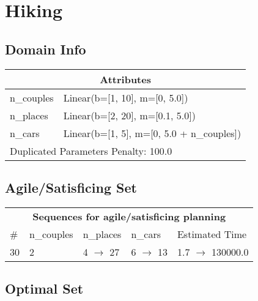 \documentclass{article}
\begin{document}
                            \newpage \section{Hiking}
                    \subsection*{Domain Info}

                    \begin{center}
                    \begin{tabular}{p{}p{}}
                    \multicolumn{2}{c}{\bf \large Attributes}\\\midrule
                    n\_couples & Linear(b=[1, 10], m=[0, 5.0])\\
n\_places & Linear(b=[2, 20], m=[0.1, 5.0])\\
n\_cars & Linear(b=[1, 5], m=[0, 5.0 + n\_couples])
                    
                     \\\midrule
                    \multicolumn{2}{l}{Duplicated Parameters Penalty: 100.0}
                    \end{tabular}
                    \end{center}
                
                         \subsection*{Agile/Satisficing Set}

                        \begin{center}
                        \begin{tabular}{l|l|l|l|l}
                        \multicolumn{5}{c}{\bf \large Sequences for agile/satisficing planning}\\
                        \# & n\_couples & n\_places & n\_cars & Estimated Time\\\midrule
                        30&2&4 $\rightarrow$ 27&6 $\rightarrow$ 13&1.7 $\rightarrow$ 130000.0
                        \end{tabular}
                        \end{center}
                    
                            \subsection*{Optimal Set}
\end{document}
